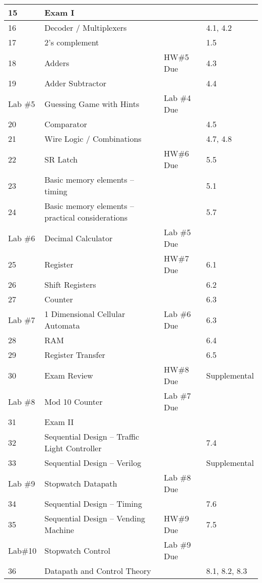 \begin{longtable}{|l|m{7cm}|l|l|}
15			& Exam I & & \\ \hline
16 			& Decoder / Multiplexers & & 4.1, 4.2 \\ \hline
17 			& 2's complement & & 1.5 \\ \hline
18 			& Adders & HW\#5 Due & 4.3 \\ \hline
19			& Adder Subtractor & & 4.4 \\ \hline
 \rowcolor{yellow} 
Lab \#5 	& Guessing Game with Hints & Lab \#4 Due & \\ \hline
20			& Comparator & & 4.5 \\ \hline
21			& Wire Logic / Combinations & & 4.7, 4.8 \\ \hline
22			& SR Latch & HW\#6 Due & 5.5 \\ \hline
23			& Basic memory elements -- timing & & 5.1 \\ \hline
24			& Basic memory elements -- practical considerations & & 5.7 \\ \hline
 \rowcolor{yellow} 
Lab \#6 	& Decimal Calculator & Lab \#5 Due & \\ \hline
25 			& Register & HW\#7 Due & 6.1 \\ \hline
26 			& Shift Registers & & 6.2 \\ \hline
27 			& Counter & & 6.3 \\ \hline
 \rowcolor{yellow} 
Lab \#7 	& 1 Dimensional Cellular Automata & Lab \#6 Due & 6.3 \\ \hline
28 			& RAM & & 6.4 \\ \hline
29 			& Register Transfer & & 6.5 \\ \hline
30			& Exam Review & HW\#8 Due & Supplemental \\ \hline
 \rowcolor{yellow} 
Lab \#8 	& Mod 10 Counter & Lab \#7 Due & \\ \hline
31			& Exam II & & \\ \hline
32 			& Sequential Design -- Traffic Light Controller & & 7.4 \\ \hline
33 			& Sequential Design -- Verilog & & Supplemental \\ \hline
 \rowcolor{yellow} 
Lab \#9 	& Stopwatch Datapath & Lab \#8 Due & \\ \hline
34 			& Sequential Design -- Timing & & 7.6 \\			 \hline
35 			& Sequential Design -- Vending Machine & HW\#9 Due & 7.5 \\ \hline
 \rowcolor{yellow} 
Lab\#10 	& Stopwatch Control & Lab \#9 Due & \\ \hline
36 			& Datapath and Control Theory & & 8.1, 8.2, 8.3 \\ \hline

\end{longtable}
